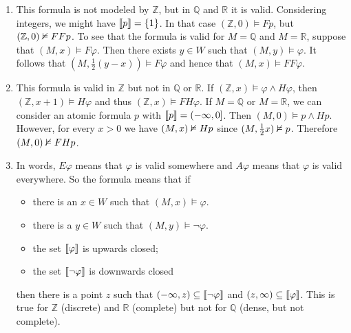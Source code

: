 \documentclass{article}
\begin{document}
\begin{ex}
\begin{enumerate}
\item This formula is not modeled by $\mathbb{Z}$, but in $\mathbb{Q}$ and $\mathbb{R}$ it is valid. Considering integers, we might have $\llbracket p\rrbracket=\{1\}$. In that case $(\mathbb{Z},0)\models Fp$, but $(\mathbb{Z},0)\nvDash FFp$. To see that the formula is valid for $M=\mathbb{Q}$ and $M=\mathbb{R}$, suppose that $(M,x)\models F\varphi$. Then there exists $y\in W$ such that $(M,y)\models\varphi$. It follows that $(M,\frac{1}{2}(y-x))\models F\varphi$ and hence that $(M,x)\models FF\varphi$. 
\item This formula is valid in $\mathbb{Z}$ but not in $\mathbb{Q}$ or $\mathbb{R}$. If $(\mathbb{Z},x)\models\varphi\land H\varphi$, then $(\mathbb{Z},x+1)\models H\varphi$ and thus $(\mathbb{Z},x)\models FH\varphi$. If $M=\mathbb{Q}$ or $M=\mathbb{R}$, we can consider an atomic formula $p$ with $\llbracket p\rrbracket=(-\infty,0]$. Then $(M,0)\models p\land Hp$. However, for every $x>0$ we have $(M,x)\nvDash Hp$ since $(M,\frac{1}{2}x)\nvDash p$. Therefore $(M,0)\nvDash FHp$.
\item In words, $E\varphi$ means that $\varphi$ is valid somewhere and $A\varphi$ means that $\varphi$ is valid everywhere. So the formula means that if
\begin{itemize}
\item there is an $x\in W$ such that $(M,x)\models \varphi$.
\item there is a $y\in W$ such that $(M,y)\models \neg\varphi$.
\item the set $\llbracket\varphi\rrbracket$ is upwards closed;
\item the set $\llbracket\neg \varphi\rrbracket$ is downwards closed
\end{itemize}
then there is a point $z$ such that $(-\infty,z)\subseteq\llbracket\neg\varphi\rrbracket$ and $(z,\infty)\subseteq\llbracket\varphi\rrbracket$. This is true for $\mathbb{Z}$ (discrete) and $\mathbb{R}$ (complete) but not for $\mathbb{Q}$ (dense, but not complete).
\end{enumerate}
\end{ex}
\end{document}
